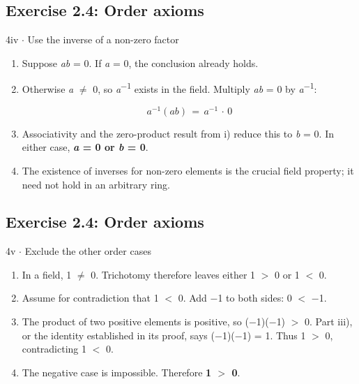\documentclass[11pt]{article}
\begin{document}
\begin{keepsection}\subsection{Exercise 2.4: Order axioms}

\begin{workedbox}{4iv \ensuremath{\cdot} Use the inverse of a non-zero factor}
\begin{enumerate}
\item Suppose \textit{a}\textit{b} = 0. If \textit{a} = 0, the conclusion already holds.
\item {}
Otherwise \textit{a} \ensuremath{\neq} 0, so \textit{a}\textsuperscript{\ensuremath{-}1} exists in the field. Multiply \textit{a}\textit{b} = 0 by \textit{a}\textsuperscript{\ensuremath{-}1}:

\begin{equation*}{a}^{-1}({a}{b})\, =\, {a}^{-1}\, \cdot \, 0\end{equation*}
\item Associativity and the zero-product result from i) reduce this to \textit{b} = 0. In either case, \textbf{\textit{a} = 0 or \textit{b} = 0}.
\item The existence of inverses for non-zero elements is the crucial field property; it need not hold in an arbitrary ring.
\end{enumerate}
\end{workedbox}

\end{keepsection}
\begin{keepsection}\subsection{Exercise 2.4: Order axioms}

\begin{workedbox}{4v \ensuremath{\cdot} Exclude the other order cases}
\begin{enumerate}
\item In a field, 1 \ensuremath{\neq} 0. Trichotomy therefore leaves either 1 \ensuremath{>} 0 or 1 \ensuremath{<} 0.
\item Assume for contradiction that 1 \ensuremath{<} 0. Add \ensuremath{-}1 to both sides: 0 \ensuremath{<} \ensuremath{-}1.
\item The product of two positive elements is positive, so (\ensuremath{-}1)(\ensuremath{-}1) \ensuremath{>} 0. Part iii), or the identity established in its proof, says (\ensuremath{-}1)(\ensuremath{-}1) = 1. Thus 1 \ensuremath{>} 0, contradicting 1 \ensuremath{<} 0.
\item The negative case is impossible. Therefore \textbf{1 \ensuremath{>} 0}.
\end{enumerate}
\end{workedbox}

\end{keepsection}
\end{document}
